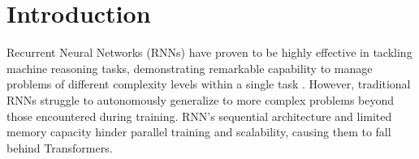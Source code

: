 \section{Introduction}
\label{sec:intro}

Recurrent Neural Networks (RNNs) have proven to be highly effective in tackling machine reasoning tasks, demonstrating remarkable capability to manage problems of different complexity levels within a single task \citep{orvieto2023resurrecting,de2024griffin,beck2024xlstm}.
However, traditional RNNs struggle to autonomously generalize to more complex problems beyond those encountered during training. %
RNN's sequential architecture and limited memory capacity hinder parallel training and scalability, causing them to fall behind Transformers.


